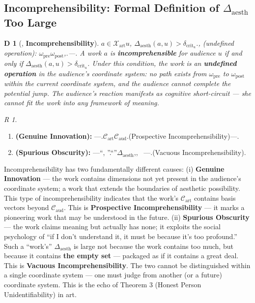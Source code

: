\documentclass[12pt,a4paper]{article}
\newtheorem{definition}[theorem]Definition
\theoremstyle{remark}
\newtheorem{remark}[theorem]Remark
\newcommand{\ArtSpace}{\mathcal{X}_{\text{art}}}
\newcommand{\AudCoord}{\mathcal{C}_{\text{aud}}}
\newcommand{\ArtCoord}{\mathcal{C}_{\text{art}}}
\newcommand{\AesthDelta}{\Delta_{\text{aesth}}}
\newcommand{\CritDelta}{\delta_{\text{crit}}}
\begin{document}
\subsection{Incomprehensibility: Formal Definition of $\AesthDelta$ Too Large}
\begin{definition}[, \textbf{Incomprehensibility}]
\label{def:incomprehensible}
$a \in \ArtSpace$$u$, $\AesthDelta(a, u) > \CritDelta_u$., (undefined operation): $\omega_{\text{pre}}$$\omega_{\text{post}}$,.---.
A work $a$ is \textbf{incomprehensible} for audience $u$ if and only if $\AesthDelta(a, u) > \CritDelta_u$. Under this condition, the work is an \textbf{undefined operation} in the audience's coordinate system: no path exists from $\omega_{\text{pre}}$ to $\omega_{\text{post}}$ within the current coordinate system, and the audience cannot complete the potential jump. The audience's reaction manifests as cognitive short-circuit --- she cannot fit the work into any framework of meaning.
\end{definition}
\begin{remark}
\begin{enumerate}[label=(\roman*)]
 \item \textbf{(Genuine Innovation): } ---.$\ArtCoord$$\AudCoord$.(Prospective Incomprehensibility)---.
 \item \textbf{(Spurious Obscurity): } ---``, ''.``''$\AesthDelta$,, \ ---.(Vacuous Incomprehensibility).
\end{enumerate}
Incomprehensibility has two fundamentally different causes: (i) \textbf{Genuine Innovation} --- the work contains dimensions not yet present in the audience's coordinate system; a work that extends the boundaries of aesthetic possibility. This type of incomprehensibility indicates that the work's $\ArtCoord$ contains basis vectors beyond $\AudCoord$. This is \textbf{Prospective Incomprehensibility} --- it marks a pioneering work that may be understood in the future. (ii) \textbf{Spurious Obscurity} --- the work claims meaning but actually has none; it exploits the social psychology of ``if I don't understand it, it must be because it's too profound.'' Such a ``work's'' $\AesthDelta$ is large not because the work contains too much, but because it contains \textbf{the empty set} --- packaged as if it contains a great deal. This is \textbf{Vacuous Incomprehensibility}. The two cannot be distinguished within a single coordinate system --- one must judge from another (or a future) coordinate system. This is the echo of Theorem 3 (Honest Person Unidentifiability) in art.
\end{remark}
\end{document}
